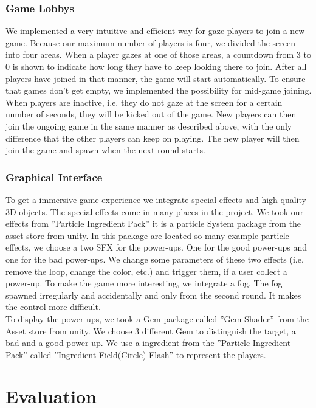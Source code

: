 \documentclass{sigchi}
\begin{document}
\subsubsection{Game Lobbys}
We implemented a very intuitive and efficient way for gaze players to join a new game. Because our maximum number of players is four, we divided the screen into four areas. When a player gazes at one of those areas, a countdown from 3 to 0 is shown to indicate how long they have to keep looking there to join. After all players have joined in that manner, the game will start automatically. To ensure that games don't get empty, we implemented the possibility for mid-game joining. When players are inactive, i.e. they do not gaze at the screen for a certain number of seconds, they will be kicked out of the game. New players can then join the ongoing game in the same manner as described above, with the only difference that the other players can keep on playing. The new player will then join the game and spawn when the next round starts. 


\subsubsection{Graphical Interface} 
To get a immersive game experience we integrate special effects and high quality 3D objects. The special effects come in many places in the project. We took our effects from ''Particle Ingredient Pack'' it is a particle System package from the asset store from unity. In this package are located so many example particle effects, we choose a two SFX for the power-ups. One for the good power-ups and one for the bad power-ups. We change some parameters of these two effects (i.e. remove the loop, change the color, etc.) and trigger them, if a user collect a power-up. To make the game more interesting, we integrate a fog. The fog spawned irregularly and accidentally and only from the second round. It makes the control more difficult.\\
To display the power-ups, we took a Gem package called ''Gem Shader'' from the Asset store from unity. We choose 3 different Gem to distinguish the target, a bad and a good power-up. We use a ingredient from the ''Particle Ingredient Pack''  called ''Ingredient-Field(Circle)-Flash'' to represent the players. 


\section{Evaluation}
\end{document}
